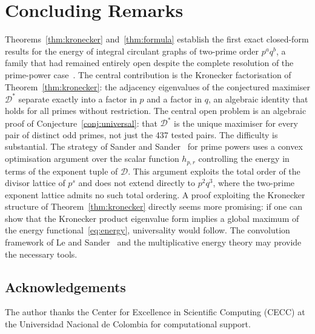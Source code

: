 \documentclass[12pt,a4paper]{article}
\theoremstyle{plain}
\theoremstyle{definition}
\newcommand{\Dstar}{\mathcal{D}^*}
\begin{document}
\section{Concluding Remarks}\label{sec:conclusion}

Theorems~\ref{thm:kronecker} and~\ref{thm:formula} establish the first
exact closed-form results for the energy of integral circulant graphs of
two-prime order $p^aq^b$, a family that had remained entirely open
despite the complete resolution of the prime-power case~\cite{SanderS2011a,SanderS2011b,SanderS2013}.
The central contribution is the Kronecker factorisation of
Theorem~\ref{thm:kronecker}: the adjacency eigenvalues of the conjectured
maximiser $\Dstar$ separate exactly into a factor in $p$ and a factor
in $q$, an algebraic identity that holds for all primes without
restriction. 
The central open problem is an algebraic proof of
Conjecture~\ref{conj:universal}: that $\Dstar$ is the unique maximiser
for every pair of distinct odd primes, not just the 437 tested pairs.
The difficulty is substantial.  The strategy of Sander and
Sander~\cite{SanderS2011a,SanderS2011b,SanderS2013} for prime powers
uses a convex optimisation argument over the scalar function $h_{p,r}$
controlling the energy in terms of the exponent tuple of $\mathcal{D}$.
This argument exploits the total order of the divisor lattice of $p^s$
and does not extend directly to $p^2q^3$, where the two-prime exponent
lattice admits no such total ordering.  A proof exploiting the Kronecker
structure of Theorem~\ref{thm:kronecker} directly seems more promising:
if one can show that the Kronecker product eigenvalue form implies a
global maximum of the energy functional~\eqref{eq:energy}, universality
would follow.  The convolution framework of Le and
Sander~\cite{LeSander2012laa,LeSander2012ijnt} and the multiplicative
energy theory may provide the necessary tools.


\subsection*{Acknowledgements}
The author thanks the Center for Excellence in Scientific Computing (CECC)
at the Universidad Nacional de Colombia for computational support.
\end{document}
